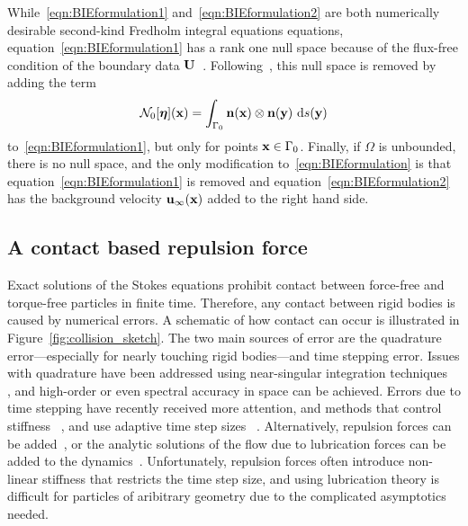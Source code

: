 \documentclass[preprint, 10pt]{elsarticle}
\begin{document}
While~\eqref{eqn:BIEformulation1} and~\eqref{eqn:BIEformulation2} are
both numerically desirable second-kind Fredholm integral equations
equations, equation~\eqref{eqn:BIEformulation1} has a rank one null
space because of the flux-free condition of the boundary data
${\mathbf{U}}$~\cite{Ladyzhenskaya1963}.  Following~\cite{Power1993}, this null
space is removed by adding the term 
\begin{align}
\label{eqn:N0_modification} 
  \mathcal{N}_0[{\boldsymbol\eta}]({\mathbf{x}}) = \int_{\Gamma_0} 
    {\mathbf{n}}({\mathbf{x}})\otimes{\mathbf{n}}({\mathbf{y}})~\text{d}s({\mathbf{y}})
\end{align}
to~\eqref{eqn:BIEformulation1}, but only for points ${\mathbf{x}} \in \Gamma_0$.
Finally, if $\Omega$ is unbounded, there is no null space, and
the only modification to~\eqref{eqn:BIEformulation} is that
equation~\eqref{eqn:BIEformulation1} is removed and
equation~\eqref{eqn:BIEformulation2} has the background velocity
${\mathbf{u}}_\infty({\mathbf{x}})$ added to the right hand side.


\subsection{A contact based repulsion force}
\label{sec:repulsion}
Exact solutions of the Stokes equations prohibit contact between
force-free and torque-free particles in finite time.  Therefore, any
contact between rigid bodies is caused by numerical errors.  A schematic
of how contact can occur is illustrated in
Figure~\ref{fig:collision_sketch}.  The two main sources of error are
the quadrature error---especially for nearly touching rigid bodies---and
time stepping error.  Issues with quadrature have been addressed using
near-singular integration techniques~\cite{Ying2006, Kockner2013,
qua-bir2014} ,
and high-order or even spectral accuracy in space can be achieved.
Errors due to time stepping have recently received more attention, and
methods that control stiffness~\cite{qua-bir2014} , and use adaptive time step sizes~\cite{Kropinski1999,
qua-bir2016} .  Alternatively, repulsion forces can be added~\cite{}, or
the analytic solutions of the flow due to lubrication forces can be
added to the dynamics~\cite{Mammoli2006}.  Unfortunately, repulsion
forces often introduce non-linear stiffness that restricts the time step
size, and using lubrication theory is difficult for particles of aribitrary geometry due to the complicated asymptotics needed.
\end{document}
